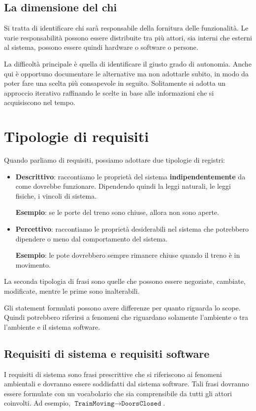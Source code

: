\subsection{La dimensione del chi}
Si tratta di identificare chi sarà responsabile della fornitura 
delle funzionalità. Le varie responsabilità possono essere
distribuite tra più attori, sia interni che esterni al sistema, possono 
essere quindi hardware o software o persone.

La difficoltà principale è quella di identificare il giusto 
grado di autonomia. Anche qui è opportuno documentare le alternative 
ma non adottarle subito, in modo da poter fare una scelta più
consapevole in seguito. Solitamente si adotta un approccio iterativo 
raffinando le scelte in base alle informazioni che si acquisiscono
nel tempo.
\section{Tipologie di requisiti}
Quando parliamo di requisiti, possiamo adottare due tipologie di registri:
\begin{itemize}
    \item \textbf{Descrittivo}: raccontiamo le proprietà del sistema \textbf{indipendentemente}
    da come dovrebbe funzionare. Dipendendo quindi la leggi naturali, 
    le leggi fisiche, i vincoli di sistema.
    
    \textbf{Esempio}: se le porte del treno sono chiuse, allora non 
    sono aperte.
    \item \textbf{Percettivo}: raccontiamo le proprietà desiderabili nel 
    sistema che potrebbero dipendere o meno dal comportamento del sistema.
    
    \textbf{Esempio}: le pote dovrebbero sempre rimanere chiuse 
    quando il treno è in movimento.
\end{itemize}
La seconda tipologia di frasi sono quelle che possono essere negoziate, 
cambiate, modificate, mentre le prime sono inalterabili.

Gli statement formulati possono avere differenze per quanto riguarda
lo scope. Quindi potrebbero riferirsi a fenomeni che riguardano
solamente l'ambiente o tra l'ambiente e il sistema software.

\subsection{Requisiti di sistema e requisiti software}
I requisiti di sistema sono frasi prescrittive che si riferiscono 
ai fenomeni ambientali e dovranno essere soddisfatti dal
sistema software. Tali frasi dovranno essere formulate con un vocabolario
che sia comprensibile da tutti gli attori coinvolti.
Ad esempio, $ \texttt{TrainMoving} \rightarrow \texttt{DoorsClosed} $.

